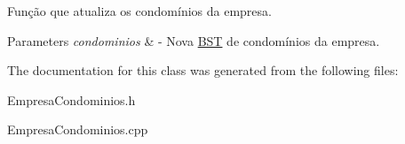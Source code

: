 Função que atualiza os condomínios da empresa. 


\begin{DoxyParams}{Parameters}
{\em condominios} & -\/ Nova \hyperlink{class_b_s_t}{B\+ST} de condomínios da empresa. \\
\hline
\end{DoxyParams}


The documentation for this class was generated from the following files\+:\begin{DoxyCompactItemize}
\item 
Empresa\+Condominios.\+h\item 
Empresa\+Condominios.\+cpp\end{DoxyCompactItemize}
